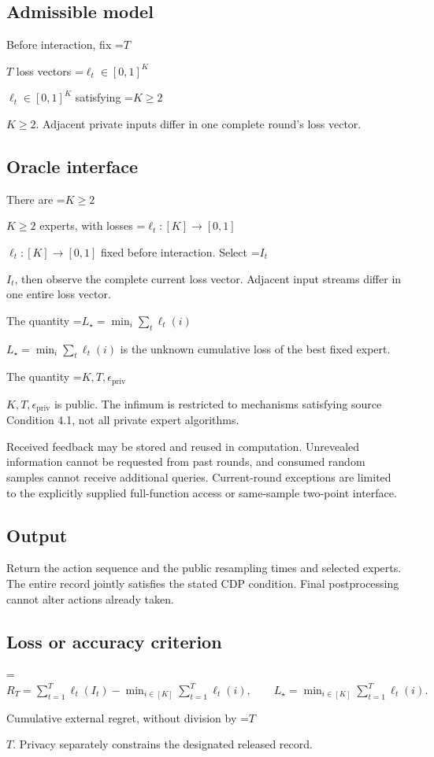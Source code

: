 \documentclass[10pt,a4paper]{article}
\newcommand{\AtlasMath}[1]{\par\begingroup\centering\setbox0=\hbox{$\displaystyle #1$}\ifdim\wd0>1.4\linewidth\typeout{ATLAS WIDE FORMULA: \the\wd0}\fi\ifdim\wd0>\linewidth\resizebox{\linewidth}{!}{\box0}\else\box0\fi\par\endgroup}
\newcommand{\AtlasInlineMath}[1]{\begingroup\setbox0=\hbox{$#1$}\ifdim\wd0>.4\linewidth\endgroup\AtlasMath{#1}\else\endgroup$#1$\fi}
\begin{document}
\subsection{Admissible model}
Before interaction, fix \AtlasInlineMath{T} loss vectors \AtlasInlineMath{\ell_t\in[0,1]^K} satisfying \AtlasInlineMath{K\ge2}. Adjacent private inputs differ in one complete round’s loss vector.

\subsection{Oracle interface}
There are \AtlasInlineMath{K\ge2} experts, with losses \AtlasInlineMath{\ell_t:[K]\to[0,1]} fixed before interaction. Select \AtlasInlineMath{I_t}, then observe the complete current loss vector. Adjacent input streams differ in one entire loss vector.

The quantity \AtlasInlineMath{L_\star=\min_i\sum_t\ell_t(i)} is the unknown cumulative loss of the best fixed expert.

The quantity \AtlasInlineMath{K,T,\epsilon_{\mathrm{priv}}} is public. The infimum is restricted to mechanisms satisfying source Condition 4.1, not all private expert algorithms.

Received feedback may be stored and reused in computation. Unrevealed information cannot be requested from past rounds, and consumed random samples cannot receive additional queries. Current-round exceptions are limited to the explicitly supplied full-function access or same-sample two-point interface.

\subsection{Output}
Return the action sequence and the public resampling times and selected experts. The entire record jointly satisfies the stated CDP condition. Final postprocessing cannot alter actions already taken.

\subsection{Loss or accuracy criterion}

\AtlasMath{R_T=\sum_{t=1}^T\ell_t(I_t)-\min_{i\in[K]}\sum_{t=1}^T\ell_t(i),\qquad L_\star=\min_{i\in[K]}\sum_{t=1}^T\ell_t(i).}


Cumulative external regret, without division by \AtlasInlineMath{T}. Privacy separately constrains the designated released record.
\end{document}
